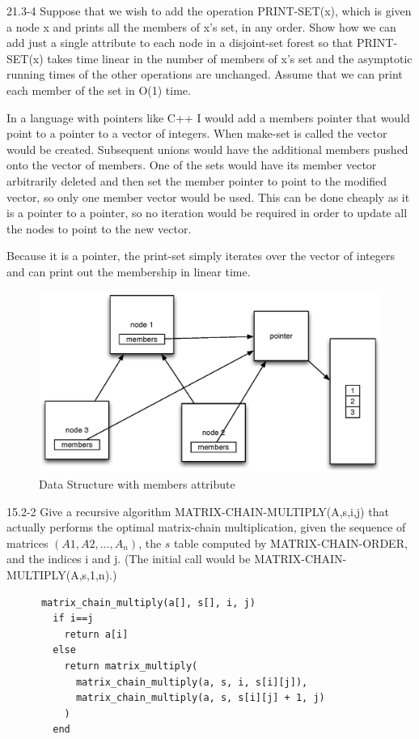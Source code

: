 \begin{problem}{21.3-4}
  Suppose that we wish to add the operation PRINT-SET(x), which is given a node x and prints all the members of x's set,
  in any order. Show how we can add just a single attribute to each node in a disjoint-set forest so that PRINT-SET(x)
  takes time linear in the number of members of x's set and the asymptotic running times of the other operations are
  unchanged. Assume that we can print each member of the set in O(1) time.
  \begin{solution}
    In a language with pointers like C++ I would add a members pointer that would point to a pointer to a vector of
    integers. When make-set is called the vector would be created. Subsequent unions would have the additional members
    pushed onto the vector of members. One of the sets would have its member vector arbitrarily deleted and then set the
    member pointer to point to the modified vector, so only one member vector would be used. This can be done cheaply as
    it is a pointer to a pointer, so no iteration would be required in order to update all the nodes to point to the new
    vector.

    Because it is a pointer, the print-set simply iterates over the vector of integers and can print out the membership
    in linear time.
    \begin{figure}[H]
      \centering
      \caption{Data Structure with members attribute}
      \includegraphics[scale=.5]{21_3_4.eps}
    \end{figure}
  \end{solution}
\end{problem}

\begin{problem}{15.2-2}
  Give a recursive algorithm MATRIX-CHAIN-MULTIPLY(A,s,i,j) that actually performs the optimal matrix-chain
  multiplication, given the sequence of matrices $(A1, A2, \ldots, A_n)$, the $s$ table computed by MATRIX-CHAIN-ORDER, and
  the indices i and j. (The initial call would be MATRIX-CHAIN-MULTIPLY(A,s,1,n).)
  \begin{solution}
    \begin{lstlisting}
      matrix_chain_multiply(a[], s[], i, j)
        if i==j
          return a[i]
        else
          return matrix_multiply(
            matrix_chain_multiply(a, s, i, s[i][j]),
            matrix_chain_multiply(a, s, s[i][j] + 1, j)
          )
        end
    \end{lstlisting}
  \end{solution}
\end{problem}

